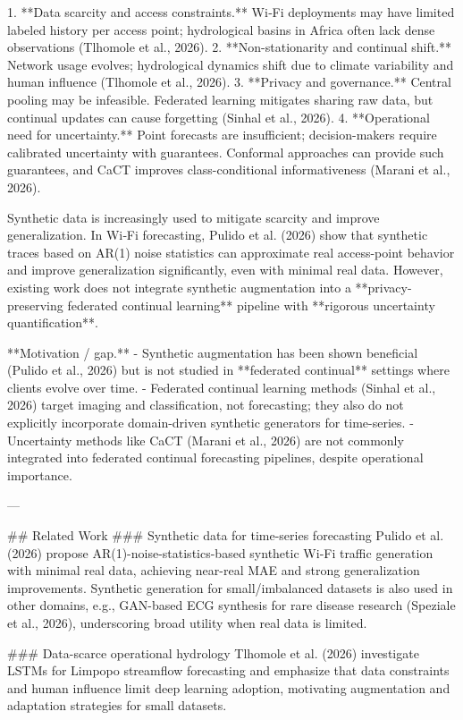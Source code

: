 1. **Data scarcity and access constraints.** Wi‑Fi deployments may have limited labeled history per access point; hydrological basins in Africa often lack dense observations (Tlhomole et al., 2026).  
2. **Non-stationarity and continual shift.** Network usage evolves; hydrological dynamics shift due to climate variability and human influence (Tlhomole et al., 2026).  
3. **Privacy and governance.** Central pooling may be infeasible. Federated learning mitigates sharing raw data, but continual updates can cause forgetting (Sinhal et al., 2026).  
4. **Operational need for uncertainty.** Point forecasts are insufficient; decision-makers require calibrated uncertainty with guarantees. Conformal approaches can provide such guarantees, and CaCT improves class-conditional informativeness (Marani et al., 2026).

Synthetic data is increasingly used to mitigate scarcity and improve generalization. In Wi‑Fi forecasting, Pulido et al. (2026) show that synthetic traces based on AR(1) noise statistics can approximate real access-point behavior and improve generalization significantly, even with minimal real data. However, existing work does not integrate synthetic augmentation into a **privacy-preserving federated continual learning** pipeline with **rigorous uncertainty quantification**.

**Motivation / gap.**  
- Synthetic augmentation has been shown beneficial (Pulido et al., 2026) but is not studied in **federated continual** settings where clients evolve over time.  
- Federated continual learning methods (Sinhal et al., 2026) target imaging and classification, not forecasting; they also do not explicitly incorporate domain-driven synthetic generators for time-series.  
- Uncertainty methods like CaCT (Marani et al., 2026) are not commonly integrated into federated continual forecasting pipelines, despite operational importance.

---

## Related Work  
### Synthetic data for time-series forecasting  
Pulido et al. (2026) propose AR(1)-noise-statistics-based synthetic Wi‑Fi traffic generation with minimal real data, achieving near-real MAE and strong generalization improvements. Synthetic generation for small/imbalanced datasets is also used in other domains, e.g., GAN-based ECG synthesis for rare disease research (Speziale et al., 2026), underscoring broad utility when real data is limited.

### Data-scarce operational hydrology  
Tlhomole et al. (2026) investigate LSTMs for Limpopo streamflow forecasting and emphasize that data constraints and human influence limit deep learning adoption, motivating augmentation and adaptation strategies for small datasets.

